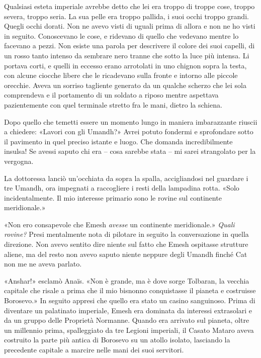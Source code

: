Qualsiasi esteta imperiale avrebbe detto che lei era troppo di troppe
cose, troppo severa, troppo seria. La sua pelle era troppo pallida, i
suoi occhi troppo grandi. Quegli occhi dorati. Non ne avevo visti di
uguali prima di allora e non ne ho visti in seguito. Conoscevano le
cose, e ridevano di quello che vedevano mentre lo facevano a pezzi. Non
esiste una parola per descrivere il colore dei suoi capelli, di un rosso
tanto intenso da sembrare nero tranne che sotto la luce più intensa. Li
portava corti, e quelli in eccesso erano arrotolati in uno chignon sopra
la testa, con alcune ciocche libere che le ricadevano sulla fronte e
intorno alle piccole orecchie. Aveva un sorriso tagliente generato da un
qualche scherzo che lei sola comprendeva e il portamento di un soldato a
riposo mentre aspettava pazientemente con quel terminale stretto fra le
mani, dietro la schiena.

Dopo quello che temetti essere un momento lungo in maniera imbarazzante
riuscii a chiedere: «Lavori con gli Umandh?» Avrei potuto fondermi e
sprofondare sotto il pavimento in quel preciso istante e luogo. Che
domanda incredibilmente insulsa! Se avessi saputo chi era -- cosa
sarebbe stata -- mi sarei strangolato per la vergogna.

La dottoressa lanciò un'occhiata da sopra la spalla, accigliandosi nel
guardare i tre Umandh, ora impegnati a raccogliere i resti della
lampadina rotta. «Solo incidentalmente. Il mio interesse primario sono
le rovine sul continente meridionale.»

«Non ero consapevole che Emesh \emph{avesse} un continente meridionale.»
\emph{Quali rovine?} Presi mentalmente nota di pilotare in seguito la
conversazione in quella direzione. Non avevo sentito dire niente sul
fatto che Emesh ospitasse strutture aliene, ma del resto non avevo
saputo niente neppure degli Umandh finché Cat non me ne aveva parlato.

«Anshar!» esclamò Anaïs. «Non è grande, ma è dove sorge Tolbaran, la
vecchia capitale che risale a prima che il mio bisnonno conquistasse il
pianeta e costruisse Borosevo.» In seguito appresi che quello era stato
un casino sanguinoso. Prima di diventare un palatinato imperiale, Emesh
era dominata da interessi extrasolari e da un gruppo delle Proprietà
Normanne. Quando era arrivato sul pianeta, oltre un millennio prima,
spalleggiato da tre Legioni imperiali, il Casato Mataro aveva costruito
la parte più antica di Borosevo su un atollo isolato, lasciando la
precedente capitale a marcire nelle mani dei suoi servitori.

